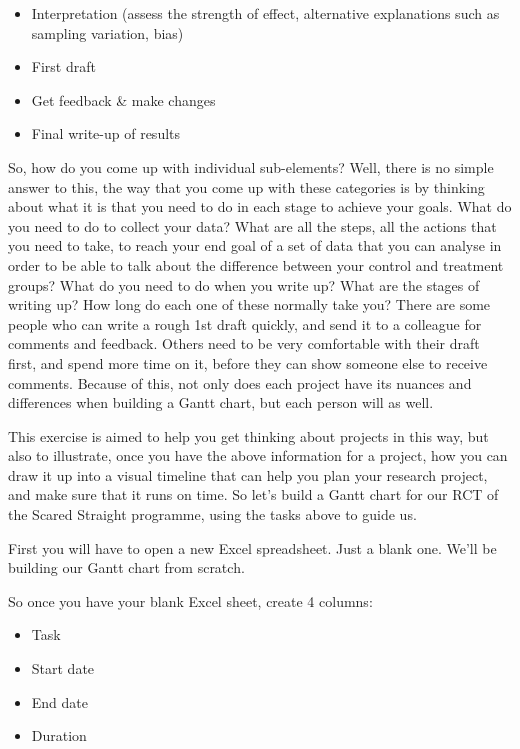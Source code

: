 \documentclass[
]{book}
\providecommand{\tightlist}{%
  \setlength{\itemsep}{0pt}\setlength{\parskip}{0pt}}
\begin{document}
\begin{itemize}
  \begin{itemize}
  \tightlist
  \item
    Interpretation (assess the strength of effect, alternative explanations such as sampling variation, bias)
  \item
    First draft
  \item
    Get feedback \& make changes
  \item
    Final write-up of results
  \end{itemize}
\end{itemize}

So, how do you come up with individual sub-elements? Well, there is no simple answer to this, the way that you come up with these categories is by thinking about what it is that you need to do in each stage to achieve your goals. What do you need to do to collect your data? What are all the steps, all the actions that you need to take, to reach your end goal of a set of data that you can analyse in order to be able to talk about the difference between your control and treatment groups? What do you need to do when you write up? What are the stages of writing up? How long do each one of these normally take you? There are some people who can write a rough 1st draft quickly, and send it to a colleague for comments and feedback. Others need to be very comfortable with their draft first, and spend more time on it, before they can show someone else to receive comments. Because of this, not only does each project have its nuances and differences when building a Gantt chart, but each person will as well.

This exercise is aimed to help you get thinking about projects in this way, but also to illustrate, once you have the above information for a project, how you can draw it up into a visual timeline that can help you plan your research project, and make sure that it runs on time. So let's build a Gantt chart for our RCT of the Scared Straight programme, using the tasks above to guide us.

First you will have to open a new Excel spreadsheet. Just a blank one. We'll be building our Gantt chart from scratch.

So once you have your blank Excel sheet, create 4 columns:

\begin{itemize}
\tightlist
\item
  Task
\item
  Start date
\item
  End date
\item
  Duration
\end{itemize}
\end{document}
